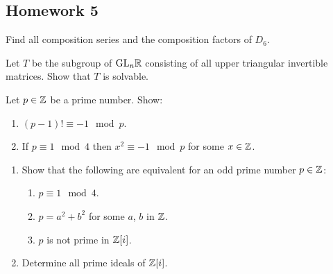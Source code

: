 \subsection{Homework 5}
\begin{problem}
  Find all composition series and the composition factors of $D_6$.
\end{problem}
\begin{solution}
\end{solution}

\begin{problem}
  Let $T$ be the subgroup of $\mathrm{GL}_n\mathbb{R}$ consisting of all upper triangular
  invertible matrices. Show that $T$ is solvable.
\end{problem}
\begin{solution}
\end{solution}

\begin{problem}
  Let $p\in\mathbb{Z}$ be a prime number. Show:
  \begin{enumerate}[label=(\alph*),noitemsep]
  \item $(p-1)!\equiv -1\mod{p}$.
  \item If $p\equiv 1\mod{4}$ then $x^2\equiv-1\mod{p}$ for some
    $x\in\mathbb{Z}$.
  \end{enumerate}
\end{problem}
\begin{solution}
\end{solution}

\begin{problem}
  \begin{enumerate}[label=(\alph*),noitemsep]
  \item Show that the following are equivalent for an odd prime number
    $p\in\mathbb{Z}$:
    \begin{enumerate}[label=(\roman*),noitemsep]
    \item $p\equiv 1\mod 4$.
    \item $p=a^2+b^2$ for some $a$, $b$ in $\mathbb{Z}$.
    \item $p$ is not prime in $\mathbb{Z}[i]$.
    \end{enumerate}
  \item Determine all prime ideals of $\mathbb{Z}[i]$.
  \end{enumerate}
\end{problem}
\begin{solution}
\end{solution}

